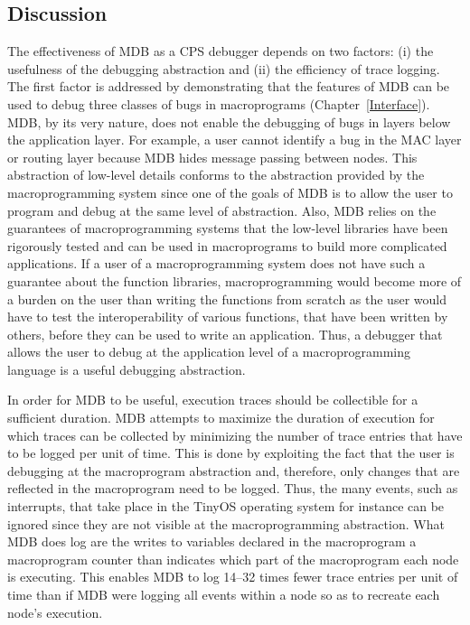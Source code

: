 \subsection{Discussion} \label{discussion} 
%
The effectiveness of MDB as a CPS debugger depends on two factors: (i) the
usefulness of the debugging abstraction and (ii) the efficiency of trace
logging. The first factor is addressed by demonstrating that the features of MDB
can be used to debug three classes of bugs in macroprograms
(Chapter~\ref{Interface}). MDB, by its very nature, does not enable the
debugging of bugs in layers below the application layer. For example, a user
cannot identify a bug in the MAC layer or routing layer because MDB hides
message passing between nodes. This abstraction of low-level details conforms to
the abstraction provided by the macroprogramming system since one of the goals
of MDB is to allow the user to program and debug at the same level of
abstraction. Also, MDB relies on the guarantees of macroprogramming systems that
the low-level libraries have been rigorously tested and can be used in
macroprograms to build more complicated applications. If a user of a
macroprogramming system does not have such a guarantee about the function
libraries, macroprogramming would become more of a burden on the user than
writing the functions from scratch as the user would have to test the
interoperability of various functions, that have been written by others, before
they can be used to write an application. Thus, a debugger that allows the user
to debug at the application level of a macroprogramming language is a useful
debugging abstraction.

In order for MDB to be useful, execution traces should be collectible for a
sufficient duration. MDB attempts to maximize the duration of execution for
which traces can be collected by minimizing the number of trace entries that
have to be logged per unit of time. This is done by exploiting the fact that the
user is debugging at the macroprogram abstraction and, therefore, only changes
that are reflected in the macroprogram need to be logged. Thus, the many events,
such as interrupts, that take place in the TinyOS operating system for instance
can be ignored since they are not visible at the macroprogramming
abstraction. What MDB does log are the writes to variables declared in the
macroprogram a macroprogram counter than indicates which part of the
macroprogram each node is executing. This enables MDB to log 14--32 times fewer
trace entries per unit of time than if MDB were logging all events within a node
so as to recreate each node's execution. 

